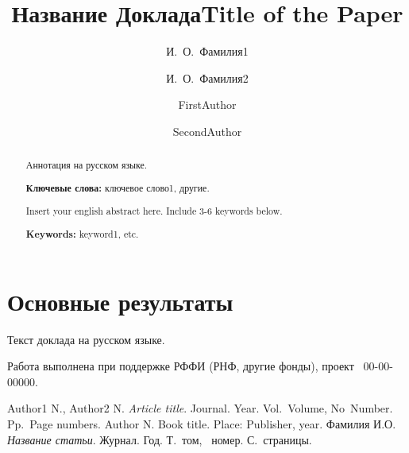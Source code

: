 \documentclass[12pt]{llncs}
\begin{document}
\title{Название Доклада}
\author{И.~О.~Фамилия1}
\author{И.~О.~Фамилия2} %

\maketitle

\begin{abstract}
Аннотация на русском языке.

{\bf Ключевые слова:} ключевое слово1, другие.
\end{abstract}

\bigskip

\section{Основные результаты} %

Текст доклада на русском языке.

Работа выполнена при поддержке РФФИ (РНФ, другие фонды), проект \textnumero~00-00-00000.


\begin{thebibliography}{9}
Author1 N., Author2 N.  {\it Article title}. Journal. Year. Vol.~Volume, No~Number. Pp.~Page numbers.
Author N. Book title. Place: Publisher, year.
 Фамилия И.О. {\it Название статьи}. Журнал. Год. Т.~том,  \textnumero~номер. С.~страницы.
\end{thebibliography}

\bigskip



\title{Title of the Paper}
\author{FirstAuthor}
\author{SecondAuthor}

\maketitle

\begin{abstract}
Insert your english abstract here. Include 3-6 keywords below.

{\bf Keywords:} keyword1,  etc.
\end{abstract}
\end{document}
